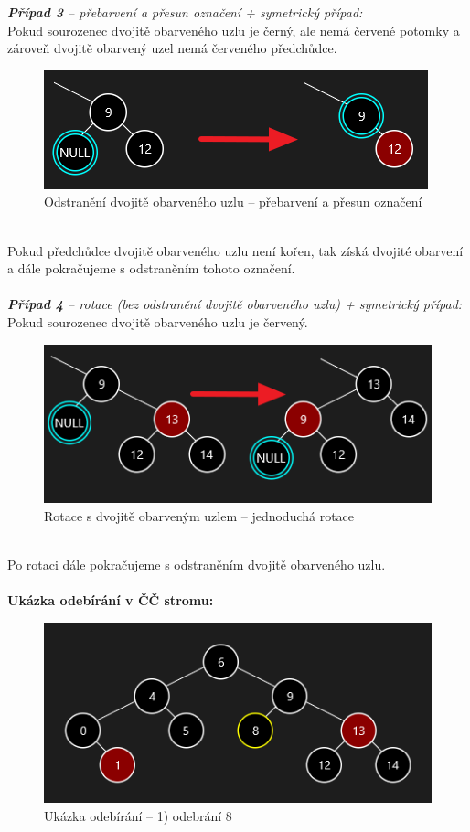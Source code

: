 \documentclass[
  biblatex=false,
  font=serif,
  glossaries=false,
  tables=false,
  theorems=false,
  index
]{kidiplom}
\begin{document}
\noindent \textit{\textbf{Případ 3} -- přebarvení a přesun označení + symetrický případ:}\\
Pokud sourozenec dvojitě obarveného uzlu je černý, ale nemá červené potomky a zároveň dvojitě obarvený uzel nemá červeného předchůdce.
\begin{figure}[h!]
\centering
	\includegraphics[scale=0.8]{obrazky/28Pripad3.png}
	\caption{Odstranění dvojitě obarveného uzlu -- přebarvení a přesun označení}
\end{figure}\\
Pokud předchůdce dvojitě obarveného uzlu není kořen, tak získá dvojité obarvení a dále pokračujeme s odstraněním tohoto označení.\\\\

\noindent \textit{\textbf{Případ 4} -- rotace (bez odstranění dvojitě obarveného uzlu) + symetrický případ:}\\
Pokud sourozenec dvojitě obarveného uzlu je červený.
\begin{figure}[h!]
\centering
	\includegraphics[scale=0.8]{obrazky/29Pripad4.png}
	\caption{Rotace s dvojitě obarveným uzlem -- jednoduchá rotace}
\end{figure}\\
\newpage
\noindent Po rotaci dále pokračujeme s odstraněním dvojitě obarveného uzlu.\\\\

\noindent \textbf{Ukázka odebírání v ČČ stromu:}
\begin{figure}[h!]
\centering
	\includegraphics[scale=0.8]{obrazky/30CCMazani.png}
	\caption{Ukázka odebírání -- 1) odebrání 8}
\end{figure}
\end{document}

